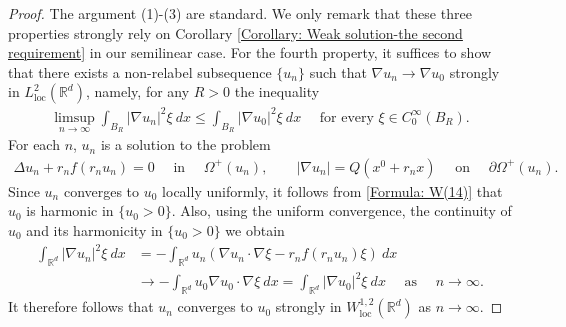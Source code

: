 \documentclass[11pt,reqno]{amsart}
\begin{document}
\begin{proof}
	The argument (1)-(3) are standard. We only remark that these three properties strongly rely on Corollary \ref{Corollary: Weak solution-the second requirement} in our semilinear case. For the fourth property, it suffices to show that there exists a non-relabel subsequence $\{u_{n}\}$ such that $\nabla u_{n}\to\nabla u_{0}$ strongly in $L_{\mathrm{loc}}^{2}(\mathbb{R}^{d})$, namely, for any $R>0$ the inequality
	\begin{align*}%
		\limsup_{n\to\infty}\int_{B_{R}}|\nabla u_{n}|^{2}\xi\:dx\leqslant\int_{B_{R}}|\nabla u_{0}|^{2}\xi\:dx\quad\text{ for every }\xi\in C_{0}^{\infty}(B_{R}).
	\end{align*}
    For each $n$, $u_{n}$ is a solution to the problem
    \begin{align}\label{Formula: W(14)}
    	\Delta u_{n}+r_{n}f(r_{n}u_{n})=0\quad\text{ in }\quad\varOmega^{+}(u_{n}),\qquad|\nabla u_{n}|=Q(x^{0}+r_{n}x)\quad\text{ on }\quad\partial\varOmega^{+}(u_{n}).
    \end{align}
    Since $u_{n}$ converges to $u_{0}$ locally uniformly, it follows from \eqref{Formula: W(14)} that $u_{0}$ is harmonic in $\{u_{0}>0\}$. Also, using the uniform convergence, the continuity of $u_{0}$ and its harmonicity in $\{u_{0}>0\}$ we obtain 
    \begin{align*}
    	\int_{\mathbb{R}^{d}}|\nabla u_{n}|^{2}\xi\:dx&=-\int_{\mathbb{R}^{d}}u_{n}\left(\nabla u_{n}\cdot\nabla\xi-r_{n}f(r_{n}u_{n})\xi\right)\:dx\\
    	&\to-\int_{\mathbb{R}^{d}}u_{0}\nabla u_{0}\cdot\nabla\xi\:dx=\int_{\mathbb{R}^{d}}|\nabla u_{0}|^{2}\xi\:dx\quad\text{ as }\quad n\to\infty.
    \end{align*}
    It therefore follows that $u_{n}$ converges to $u_{0}$ strongly in $W_{\mathrm{loc}}^{1,2}(\mathbb{R}^{d})$ as $n\to\infty$. 
    

\end{proof}
\end{document}
